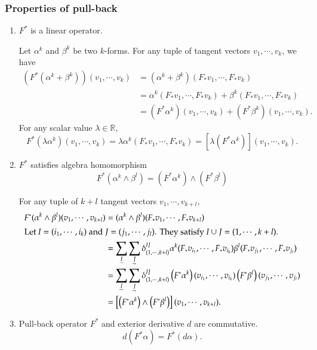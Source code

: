 \documentclass[11pt, a4paper]{book}
\begin{document}
\subsubsection{Properties of pull-back}

\begin{enumerate}
\item $F^{*}$ is a linear operator.
  \begin{Proof}
    Let $\alpha^k$ and $\beta^k$ be two $k$-forms. For any tuple of tangent vectors
    $v_1,\cdots,v_k$, we have
    \begin{align*}
      \left( F^{*} (\alpha^k + \beta^k) \right) (v_1,\cdots,v_k)
      &= (\alpha^k+\beta^k)(F_{*}v_1,\cdots,F_{*}v_k) \\
      &= \alpha^k(F_{*}v_1,\cdots,F_{*}v_k) + \beta^k(F_{*}v_1,\cdots,F_{*}v_k) \\
      &= \left( F^{*}\alpha^k \right)(v_1,\cdots,v_k) + \left( F^{*}\beta^k \right)(v_1,\cdots,v_k).
    \end{align*}
    For any scalar value $\lambda \in \mathbb{R}$,
    \begin{equation*}
      F^{*}(\lambda\alpha^k)(v_1,\cdots,v_k) = \lambda\alpha^k(F_{*}v_1,\cdots,F_{*}v_k) =
      \left[ \lambda \left( F^{*}\alpha^k \right) \right](v_1,\cdots,v_k).
    \end{equation*}
  \end{Proof}
\item $F^{*}$ satisfies algebra homomorphism
  \begin{equation}
    F^{*} \left( \alpha^k \wedge \beta^l \right) = \left( F^{*}\alpha^k \right) \wedge \left( F^{*}\beta^l \right)
  \end{equation}
  \begin{Proof}
    For any tuple of $k+l$ tangent vectors $v_1,\cdots,v_{k+l}$,
    \begin{align*}
      F^{*}(\alpha^k \wedge \beta^l)(v_1,\cdots,v_{k+l})
      &= (\alpha^k \wedge \beta^l)(F_{*}v_1,\cdots,F_{*}v_{k+l}) \\
      \intertext{Let $I = (i_1,\cdots,i_k)$ and $J = (j_1,\cdots,j_l)$. They satisfy $I
      \cup J = (1,\cdots,k+l)$.}
      &=
        \sum_{\underaccent{\rightharpoondown}{I}}\sum_{\underaccent{\rightharpoondown}{J}}
        \delta_{(1,\cdots,k+l)}^{IJ} \alpha^k(F_{*}v_{i_1},\cdots,F_{*}v_{i_k})
        \beta^l(F_{*}v_{j_1},\cdots,F_{*}v_{j_l}) \\
      &=
        \sum_{\underaccent{\rightharpoondown}{I}}\sum_{\underaccent{\rightharpoondown}{J}}
        \delta_{(1,\cdots,k+l)}^{IJ} \left( F^{*}\alpha^k \right)(v_{i_1},\cdots,v_{i_k})
        \left( F^{*}\beta^l \right)(v_{j_1},\cdots,v_{j_l}) \\
      &= \left[ \left( F^{*}\alpha^k \right) \wedge \left( F^{*}\beta^l \right)\right]
        (v_1,\cdots,v_{k+l}).
    \end{align*}
  \end{Proof}
\item Pull-back operator $F^{*}$ and exterior derivative $d$ are commutative.
  \begin{equation}
    d \left( F^{*}\alpha \right) = F^{*}(d\alpha).
  \end{equation}


\end{enumerate}
\end{document}
